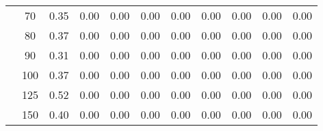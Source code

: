 \begin{table}[t]
\begin{center}
\begin{subtable}[c]{\textwidth}
\begin{center}
\begin{tabular}{rcccccccccc}
                                        & \multicolumn{1}{c|}{70}  & \num{0.35}  & \num{0.00}  & \num{0.00}  & \num{0.00}  & \num{0.00}  & \num{0.00}  & \num{0.00}  & \num{0.00}  & \num{0.00}  \\
                                        & \multicolumn{1}{c|}{80}  & \num{0.37}  & \num{0.00}  & \num{0.00}  & \num{0.00}  & \num{0.00}  & \num{0.00}  & \num{0.00}  & \num{0.00}  & \num{0.00}  \\
                                        & \multicolumn{1}{c|}{90}  & \num{0.31}  & \num{0.00}  & \num{0.00}  & \num{0.00}  & \num{0.00}  & \num{0.00}  & \num{0.00}  & \num{0.00}  & \num{0.00}  \\
                                        & \multicolumn{1}{c|}{100}  & \num{0.37}  & \num{0.00}  & \num{0.00}  & \num{0.00}  & \num{0.00}  & \num{0.00}  & \num{0.00}  & \num{0.00}  & \num{0.00}  \\
                                        & \multicolumn{1}{c|}{125}  & \num{0.52}  & \num{0.00}  & \num{0.00}  & \num{0.00}  & \num{0.00}  & \num{0.00}  & \num{0.00}  & \num{0.00}  & \num{0.00}  \\
                                        & \multicolumn{1}{c|}{150}  & \num{0.40}  & \num{0.00}  & \num{0.00}  & \num{0.00}  & \num{0.00}  & \num{0.00}  & \num{0.00}  & \num{0.00}  & \num{0.00}  \\
                                    \end{tabular}
            \end{center}
        \end{subtable}

        \vspace{5mm}


\end{center}
\end{table}
